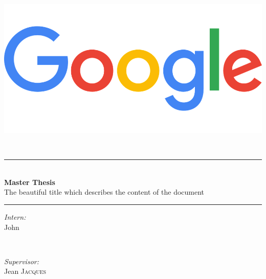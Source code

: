 \begin{titlepage}


\begin{center}


	\begin{minipage}{1\textwidth}
		\begin{center}
			\includegraphics[width=.7\textwidth]{logos/logo.png}\\[1cm]
		\end{center}
	\end{minipage}


	\\[.7cm]

        \begin{minipage}{0.8\textwidth} \begin{center}
        \rule{1\textwidth}{.1pt}\\%

        {\Large \textbf{Master Thesis}\\[.5cm]\Huge\og\color{rikenBlue}The beautiful title which describes the content of the document\fg{}}\\[0.3cm]

        \rule{1\textwidth}{.1pt}
        \end{center}\end{minipage}\vspace{1cm}

	\begin{minipage}{0.4\textwidth}
	\begin{flushleft} \large
	\emph{Intern:}\\
	John 
	\end{flushleft}
	\end{minipage}
	~
	\begin{minipage}{0.4\textwidth}
	\begin{flushright} \large
	\emph{Supervisor:} \\
	Jean \textsc{Jacques}
	\end{flushright}
	\end{minipage}


\end{center}
\end{titlepage}
